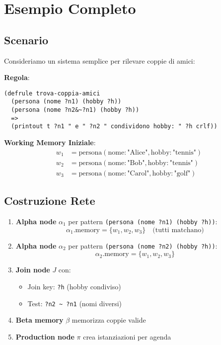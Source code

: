 \section{Esempio Completo}

\subsection{Scenario}

Consideriamo un sistema semplice per rilevare coppie di amici:

\textbf{Regola}:
\begin{lstlisting}[language=CLIPS]
(defrule trova-coppia-amici
  (persona (nome ?n1) (hobby ?h))
  (persona (nome ?n2&~?n1) (hobby ?h))
  =>
  (printout t ?n1 " e " ?n2 " condividono hobby: " ?h crlf))
\end{lstlisting}

\textbf{Working Memory Iniziale}:
\begin{align*}
w_1 &= \text{persona}(\text{nome}: \text{"Alice"}, \text{hobby}: \text{"tennis"})\\
w_2 &= \text{persona}(\text{nome}: \text{"Bob"}, \text{hobby}: \text{"tennis"})\\
w_3 &= \text{persona}(\text{nome}: \text{"Carol"}, \text{hobby}: \text{"golf"})
\end{align*}

\subsection{Costruzione Rete}

\begin{enumerate}
\item \textbf{Alpha node} $\alpha_1$ per pattern \texttt{(persona (nome ?n1) (hobby ?h))}:
\begin{equation}
\alpha_1.\text{memory} = \{w_1, w_2, w_3\} \quad \text{(tutti matchano)}
\end{equation}

\item \textbf{Alpha node} $\alpha_2$ per pattern \texttt{(persona (nome ?n2) (hobby ?h))}:
\begin{equation}
\alpha_2.\text{memory} = \{w_1, w_2, w_3\}
\end{equation}

\item \textbf{Join node} $J$ con:
\begin{itemize}
\item Join key: \texttt{?h} (hobby condiviso)
\item Test: \texttt{?n2 \~{} ?n1} (nomi diversi)
\end{itemize}

\item \textbf{Beta memory} $\beta$ memorizza coppie valide

\item \textbf{Production node} $\pi$ crea istanziazioni per agenda
\end{enumerate}


